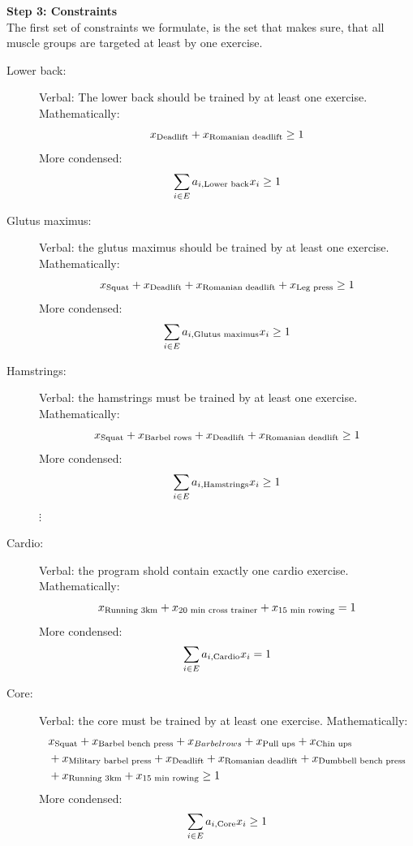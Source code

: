 \documentclass[11pt]{article}
\begin{document}
\begin{description}
{        \textbf{Step 3: Constraints}\\
        The first set of constraints we formulate, is the set that makes sure, that all muscle groups are targeted at least by one exercise.
        \begin{description}
            \item[Lower back:] Verbal: The lower back should be trained by at least one exercise. Mathematically:
            \[
                x_{\textup{Deadlift}} + x_{\textup{Romanian deadlift}} \geq 1
            \]
            More condensed:
            \[
                \sum_{i\in E} a_{i,\textup{Lower back}}x_i\geq 1
            \]
            \item[Glutus maximus:] Verbal: the glutus maximus should be trained by at least one exercise. Mathematically: 
            \[
                x_{\textup{Squat}}+ x_{\textup{Deadlift}} + x_{\textup{Romanian deadlift}} + x_{\textup{Leg press}} \geq 1
            \]
            More condensed:
            \[
                \sum_{i\in E} a_{i,\textup{Glutus maximus}}x_i\geq 1
            \]
            
            \item[Hamstrings:] Verbal: the hamstrings must be trained by at least one exercise. Mathematically:
            \[
                x_{\textup{Squat}} + x_{\textup{Barbel rows}} + x_{\textup{Deadlift}} + x_{\textup{Romanian deadlift}} \geq 1
            \]
            More condensed:
            \[
                \sum_{i\in E} a_{i,\textup{Hamstrings}}x_i\geq 1
            \]
            $\vdots$
            \item[Cardio:] Verbal: the program shold contain exactly one cardio exercise.
            Mathematically:
            \[
                x_{\textup{Running 3km}} + x_{\textup{20 min cross trainer}} + x_{\textup{15 min rowing}} = 1
            \]
             More condensed:
            \[
                \sum_{i\in E} a_{i,\textup{Cardio}}x_i= 1
            \]
            \item[Core:] Verbal: the core must be trained by at least one exercise. Mathematically:
            \begin{align}
                & x_{\textup{Squat}} + x_{\textup{Barbel bench press}} + x_{Barbel rows} + x_{\textup{Pull ups}} + x_{\textup{Chin ups}}\\
                &+ x_{\textup{Military barbel press}}  + x_{\textup{Deadlift}} + x_{\textup{Romanian deadlift}} + x_{\textup{Dumbbell bench press}}\\
                &+ x_{\textup{Running 3km}} + x_{\textup{15 min rowing}} \geq 1
            \end{align}
             More condensed:
            \[
                \sum_{i\in E} a_{i,\textup{Core}}x_i\geq 1
            \]
            

\end{description}}
\end{description}
\end{document}
